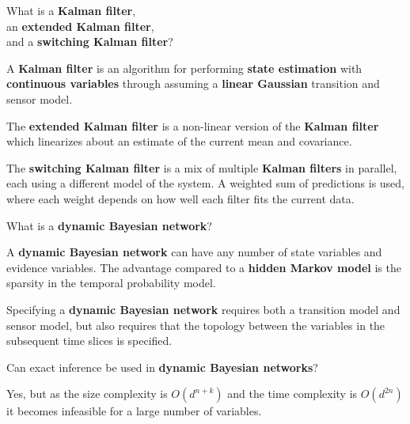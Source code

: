 \begin{flashcard}[Question]{What is a \textbf{Kalman filter},\\an \textbf{extended Kalman filter},\\and a \textbf{switching Kalman filter}?}
\begin{center}
A \textbf{Kalman filter} is an algorithm for performing \textbf{state estimation} with \textbf{continuous variables} through assuming a \textbf{linear Gaussian} transition and sensor model.

\medskip

The \textbf{extended Kalman filter} is a non-linear version of the \textbf{Kalman filter} which linearizes about an estimate of the current mean and covariance.

\medskip

The \textbf{switching Kalman filter} is a mix of multiple \textbf{Kalman filters} in parallel, each using a different model of the system. A weighted sum of predictions is used, where each weight depends on how well each filter fits the current data.
\end{center}
\end{flashcard}

\begin{flashcard}[Question]{What is a \textbf{dynamic Bayesian network}?}
\begin{center}
A \textbf{dynamic Bayesian network} can have any number of state variables and evidence variables. The advantage compared to a \textbf{hidden Markov model} is the sparsity in the temporal probability model.

\medskip

Specifying a \textbf{dynamic Bayesian network} requires both a transition model and sensor model, but also requires that the topology between the variables in the subsequent time slices is specified.
\end{center}
\end{flashcard}

\begin{flashcard}[Question]{Can exact inference be used in \textbf{dynamic Bayesian networks}?}
\begin{center}
Yes, but as the size complexity is $O(d^{n+k})$ and the time complexity is $O(d^{2n})$ it becomes infeasible for a large number of variables.
\end{center}
\end{flashcard}

\begin{flashcard}[Question]{}
\end{flashcard}

\begin{flashcard}[Question]{}
\end{flashcard}

\begin{flashcard}[Question]{}
\end{flashcard}

\begin{flashcard}[Question]{}
\end{flashcard}

\begin{flashcard}[Question]{}
\end{flashcard}
